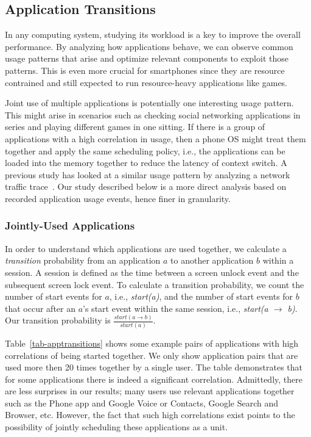 \subsection{Application Transitions}
\label{subsec-apptransitions}



In any computing system, studying its workload is a key to improve the
overall performance. By analyzing how applications behave, we can observe
common usage patterns that arise and optimize relevant components to exploit
those patterns. This is even more crucial for smartphones since they are
resource contrained and still expected to run resource-heavy applications
like games.

Joint use of multiple applications is potentially one interesting usage pattern.
This might arise in scenarios such as checking social networking applications in
series and playing different games in one sitting. If there is a group of
applications with a high correlation in usage, then a phone OS might treat them
together and apply the same scheduling policy, i.e., the applications can be
loaded into the memory together to reduce the latency of context switch.
A previous study has looked at a similar usage pattern by analyzing a network
traffic trace~\cite{xu:imc:2011}. Our study described below is a more direct
analysis based on recorded application usage events, hence finer in granularity.

\subsubsection{Jointly-Used Applications}
In order to understand which applications are used together, we calculate a {\it
transition} probability from an application $a$ to another application $b$
within a session. A session is defined as the time between a screen unlock event
and the subsequent screen lock event. To calculate a transition probability, we
count the number of start events for $a$, i.e., {\it start(a)}, and the number
of start events for $b$ that occur after an $a$'s start event within the same
session, i.e., {\it start(a $\rightarrow$ b)}. Our transition probability is
$\frac{start(a \rightarrow b)}{start(a)}$.

Table~\ref{tab-apptransitions} shows some example pairs of applications with
high correlations of being started together. We only show application pairs that
are used more then 20 times together by a single user. The table demonstrates
that for some applications there is indeed a significant correlation.
Admittedly, there are less surprises in our results; many users use
relevant applications together such as the Phone app and Google Voice or
Contacts, Google Search and Browser, etc. However, the fact that such high
correlations exist points to the possibility of jointly scheduling these
applications as a unit.

